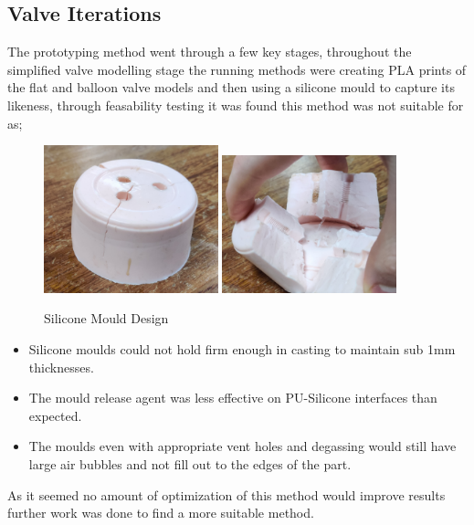 \subsection{Valve Iterations}
The prototyping method went through a few key stages, throughout the simplified valve modelling stage the running methods were creating \gls{PLA} prints of the flat and balloon valve models and then using a silicone mould to capture its likeness, through feasability testing it was found this method was not suitable for as;
\begin{figure}
    \centering
    \includegraphics[width=0.45\textwidth]{figures/silicone mould}
    \includegraphics[width=0.45\textwidth]{figures/silicone mould open}
    \caption{Silicone Mould Design}
    \label{fig:silimould}
\end{figure}
\begin{itemize}
    \item Silicone moulds could not hold firm enough in casting to maintain sub 1mm thicknesses.
    \item The mould release agent was less effective on \gls{PU}-Silicone interfaces than expected.
    \item The moulds even with appropriate vent holes and degassing would still have large air bubbles and not fill out to the edges of the part.
\end{itemize}
As it seemed no amount of optimization of this method would improve results further work was done to find a more suitable method.

